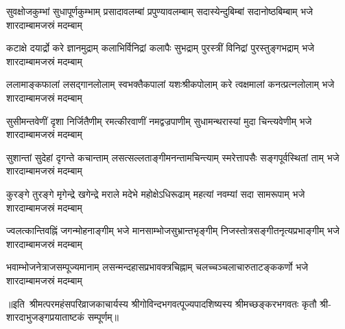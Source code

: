 

\fourlineindentedshloka
{सुवक्षोजकुम्भां सुधापूर्णकुम्भाम्}
{प्रसादावलम्बां प्रपुण्यावलम्बाम्}
{सदास्येन्दुबिम्बां सदानोष्ठबिम्बाम्}
{भजे शारदाम्बामजस्रं मदम्बाम्}

\fourlineindentedshloka
{कटाक्षे दयार्द्रो करे ज्ञानमुद्राम्}
{कलाभिर्विनिद्रां कलापैः सुभद्राम्}
{पुरस्त्रीं विनिद्रां पुरस्तुङ्गभद्राम्}
{भजे शारदाम्बामजस्रं मदम्बाम्}

\fourlineindentedshloka
{ललामाङ्कफालां लसद्गानलोलाम्}
{स्वभक्तैकपालां यशःश्रीकपोलाम्}
{करे त्वक्षमालां कनत्प्रत्नलोलाम्}
{भजे शारदाम्बामजस्रं मदम्बाम्}

\fourlineindentedshloka
{सुसीमन्तवेणीं दृशा निर्जितैणीम्}
{रमत्कीरवाणीं नमद्वज्रपाणीम्}
{सुधामन्थरास्यां मुदा चिन्त्यवेणीम्}
{भजे शारदाम्बामजस्रं मदम्बाम्}

\fourlineindentedshloka
{सुशान्तां सुदेहां दृगन्ते कचान्ताम्}
{लसत्सल्लताङ्गीमनन्तामचिन्त्याम्}
{स्मरेत्तापसैः सङ्गपूर्वस्थितां ताम्}
{भजे शारदाम्बामजस्रं मदम्बाम्}

\fourlineindentedshloka
{कुरङ्गे तुरङ्गे मृगेन्द्रे खगेन्द्रे}
{मराले मदेभे महोक्षेऽधिरूढाम्}
{महत्यां नवम्यां सदा सामरूपाम्}
{भजे शारदाम्बामजस्रं मदम्बाम्}

\fourlineindentedshloka
{ज्वलत्कान्तिवह्निं जगन्मोहनाङ्गीम्}
{भजे मानसाम्भोजसुभ्रान्तभृङ्गीम्}
{निजस्तोत्रसङ्गीतनृत्यप्रभाङ्गीम्}
{भजे शारदाम्बामजस्रं मदम्बाम्}

\fourlineindentedshloka
{भवाम्भोजनेत्राजसम्पूज्यमानाम्}
{लसन्मन्दहासप्रभावक्त्रचिह्नाम्}
{चलच्चञ्चलाचारुताटङ्ककर्णो}
{भजे शारदाम्बामजस्रं मदम्बाम्}

॥इति~श्रीमत्परमहंसपरिव्राजकाचार्यस्य श्रीगोविन्दभगवत्पूज्यपादशिष्यस्य 
श्रीमच्छङ्करभगवतः कृतौ श्री-शारदाभुजङ्गप्रयाताष्टकं सम्पूर्णम्॥